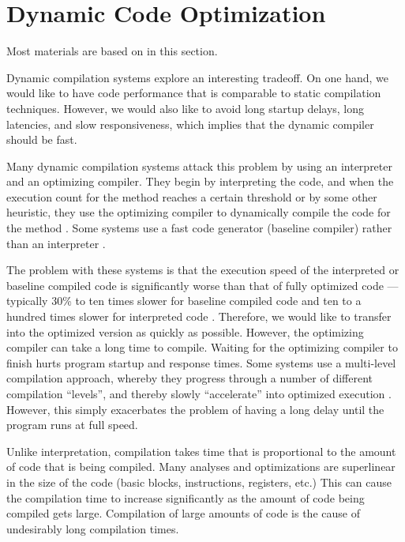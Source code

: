 \newpage

\section{Dynamic Code Optimization}

Most materials are based on \cite{whaley2001partial,stadler2014partial} in this section.

Dynamic compilation systems explore an interesting tradeoff. On one hand, we would like to have code performance
that is comparable to static compilation techniques. However, we would also like to avoid long startup delays, long
latencies, and slow responsiveness, which implies that the
dynamic compiler should be fast.

Many dynamic compilation systems attack this problem by
using an interpreter and an optimizing compiler. They begin
by interpreting the code, and when the execution count for
the method reaches a certain threshold or by some other
heuristic, they use the optimizing compiler to dynamically
compile the code for the method\cite{suganuma2000overview,paleczny2001java} . Some systems
use a fast code generator (baseline compiler) rather than an
interpreter \cite{burke1999jalapeno, cierniak2000practicing}.

The problem with these systems is that the execution speed
of the interpreted or baseline compiled code is significantly
worse than that of fully optimized code — typically 30\% to
ten times slower for baseline compiled code \cite{burke1999jalapeno, cierniak2000practicing} and ten
to a hundred times slower for interpreted code \cite{suganuma2000overview,paleczny2001java}.
Therefore, we would like to transfer into the optimized version as quickly as possible. However, the optimizing compiler can take a long time to compile. Waiting for the optimizing compiler to finish hurts program startup and response times. Some systems use a multi-level compilation
approach, whereby they progress through a number of different compilation “levels”, and thereby slowly “accelerate”
into optimized execution \cite{paleczny2001java,suganuma2001dynamic}. However, this simply
exacerbates the problem of having a long delay until the
program runs at full speed.

Unlike interpretation, compilation takes time that is proportional to the amount of code that is being compiled. Many
analyses and optimizations are superlinear in the size of the
code (basic blocks, instructions, registers, etc.) This can
cause the compilation time to increase significantly as the
amount of code being compiled gets large. Compilation of
large amounts of code is the cause of undesirably long compilation times.


